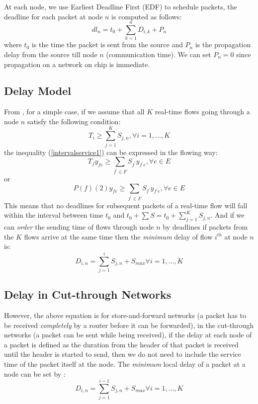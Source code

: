\documentclass[10pt]{article}
\begin{document}
At each node, we use Earliest Deadline First (EDF) \cite{Verma_inproceedings} 
to schedule packets, the deadline for each packet at node $n$ is computed as 
follows: 
\begin{equation}\label{deadline1}
dl_n=t_0 + \sum_{k=1}^{n}D_{i,k}+P_n
\end{equation}
where $t_0$ is the time the packet is sent from the source and $P_n$ is the propagation
delay from the source till node $n$ (communication time). We can set $P_n=0$ since
propagation on a network on chip is immediate.
\subsection{Delay Model}
From \cite{Ferrari90ascheme}, for a simple case, if we assume that all $K$ 
real-time flows going through a node $n$ satisfy the following condition:
\begin{equation}\label{intervalservice1}
T_i \geq \sum_{j=1}^KS_{j,n}, \forall i = 1,...,K
\end{equation}
the inequality (\ref{intervalservice1}) can be expressed in the flowing way:
\begin{equation}
T_f y_{fe}\geq \sum_{f^{'} \in F} S_{f^{'}}y_{f^{'}e}, \forall e \in E
\end{equation}
or
\begin{equation}
P(f)(2) y_{fe}\geq \sum_{f^{'} \in F} S_{f^{'}}y_{f^{'}e}, \forall e \in E
\end{equation}
This means that no deadlines for subsequent packets of a real-time flow will fall within the interval 
between time $t_0$ and $t_0 + \sum S = t_0 + \sum_{j=1}^KS_{j,n}$. And if we can {\em order} the 
sending time of flows through node $n$ by deadlines if packets
from the $K$ flows arrive at the same time then the {\em minimum} delay of flow $i^{th}$ at 
node $n$ is:
\begin{equation}
D_{i,n} = \sum_{j=1}^iS_{j,n}+S_{max} \forall i = 1, ..., K
\end{equation}

\subsection{Delay in Cut-through Networks}
However, the above equation is for store-and-forward networks \cite{DallyPrinNetwork} (a packet has to be
received {\em completely} by a router before it can be forwarded), in the cut-through 
networks (a packet can be sent while being received), if the delay at each node of a packet is defined as the duration from the header of that  packet
is received until the header is started to send, then we do not need to include
the service time of the packet itself at the node. The {\em minimum} local delay of 
a packet at a node can be set by :
\begin{equation}\label{nodedelay1}
D_{i,n} = \sum_{j=1}^{i-1}S_{j,n}+S_{max} \forall i = 1, ..., K
\end{equation}
\end{document}
